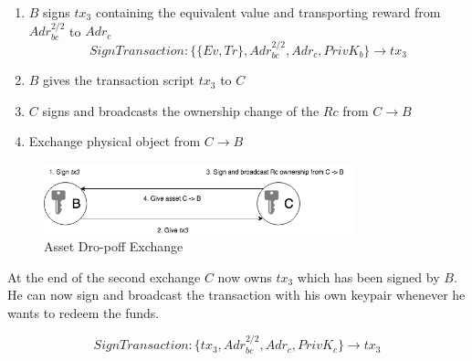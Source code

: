 \begin{enumerate}
  \item $B$ signs $tx_3$ containing the equivalent value and transporting reward from $Adr_{bc}^{2/2}$ to $Adr_c$
  \[SignTransaction \colon \{\{Ev, Tr\}, Adr_{bc}^{2/2}, Adr_c, PrivK_b\} \rightarrow tx_3\]
  \item $B$ gives the transaction script $tx_3$ to $C$
  \item $C$ signs and broadcasts the ownership change of the $Rc$ from $C\rightarrow B$
  \item Exchange physical object from $C\rightarrow B$
\end{enumerate}

\begin{figure}[h]
\centering
\includegraphics[width=0.8\textwidth]{images/exchange_02.png}
\caption{Asset Dro-poff Exchange}
\label{fig:3 drop-off exchange}
\end{figure}

At the end of the second exchange $C$ now owns $tx_3$ which has been signed by $B$. He can now sign and broadcast the transaction with his own keypair whenever he wants to redeem the funds.

\[SignTransaction \colon \{tx_3, Adr_{bc}^{2/2}, Adr_c, PrivK_c\} \rightarrow tx_3\]
